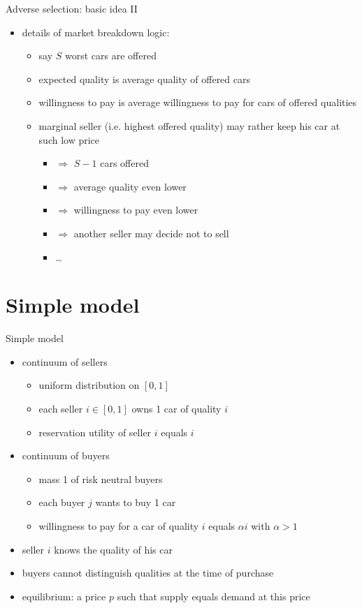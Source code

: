 \documentclass[bigger]{beamer}
\newcommand{\Ra}{\Rightarrow} \newcommand{\ra}{\rightarrow} \newcommand{\Lra}{\Leftrightarrow}
\begin{document}
\begin{frame}[label={sec:org1dd473d}]{Adverse selection: basic idea II}
\begin{itemize}
\item details of market breakdown logic:
\begin{itemize}
\item say \(S\) worst cars are offered
\item expected quality is average quality of offered cars
\item willingness to pay is average willingness to pay for cars of offered qualities
\item marginal seller (i.e. highest offered quality) may rather keep his car at such low price
\begin{itemize}
\item \(\Ra\) \(S-1\) cars offered
\item \(\Ra\) average quality even lower
\item \(\Ra\) willingness to pay even lower
\item \(\Ra\) another seller may decide not to sell
\item \dots{}
\end{itemize}
\end{itemize}
\end{itemize}
\end{frame}
\section{Simple model}
\label{sec:orgc3ccec1}
\begin{frame}[label={sec:orgb094999}]{Simple model}
\begin{itemize}
\item continuum of sellers 
\begin{itemize}
\item uniform distribution on \([0,1]\)
\item each seller \(i\in[0,1]\) owns 1 car of quality \(i\)
\item reservation utility of seller \(i\) equals \(i\)
\end{itemize}
\item continuum of buyers
\begin{itemize}
\item mass 1 of risk neutral buyers
\item each buyer \(j\) wants to buy 1 car
\item willingness to pay for a car of quality \(i\) equals \(\alpha i\) with \(\alpha>1\)
\end{itemize}
\item seller \(i\) knows the quality of his car
\item buyers cannot distinguish qualities at the time of purchase
\item equilibrium: a price \(p\) such that supply equals demand at this price
\end{itemize}
\end{frame}
\end{document}

